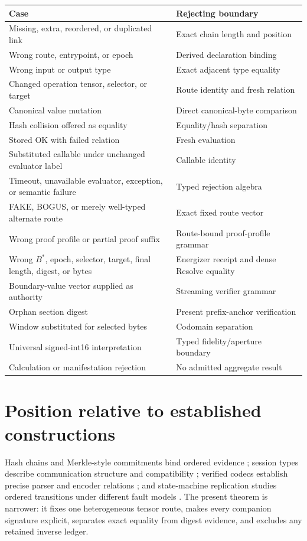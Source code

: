 \documentclass[11pt,letterpaper]{article}
\theoremstyle{definition}
\begin{document}
\begin{table}[ht]
\centering\small
\begin{tabularx}{\textwidth}{@{}YY@{}}
\toprule
Case & Rejecting boundary\\
\midrule
Missing, extra, reordered, or duplicated link & Exact chain length and position\\
Wrong route, entrypoint, or epoch & Derived declaration binding\\
Wrong input or output type & Exact adjacent type equality\\
Changed operation tensor, selector, or target & Route identity and fresh relation\\
Canonical value mutation & Direct canonical-byte comparison\\
Hash collision offered as equality & Equality/hash separation\\
Stored OK with failed relation & Fresh evaluation\\
Substituted callable under unchanged evaluator label & Callable identity\\
Timeout, unavailable evaluator, exception, or semantic failure & Typed rejection algebra\\
FAKE, BOGUS, or merely well-typed alternate route & Exact fixed route vector\\
Wrong proof profile or partial proof suffix & Route-bound proof-profile grammar\\
Wrong $B^*$, epoch, selector, target, final length, digest, or bytes & Energizer receipt and dense Resolve equality\\
Boundary-value vector supplied as authority & Streaming verifier grammar\\
Orphan section digest & Present prefix-anchor verification\\
Window substituted for selected bytes & Codomain separation\\
Universal signed-int16 interpretation & Typed fidelity/aperture boundary\\
Calculation or manifestation rejection & No admitted aggregate result\\
\bottomrule
\end{tabularx}
\end{table}

\section{Position relative to established constructions}

Hash chains and Merkle-style commitments bind ordered evidence
\cite{merkle1988}; session types describe communication structure and
compatibility \cite{honda2008}; verified codecs establish precise parser and
encoder relations \cite{delaware2019}; and state-machine replication studies
ordered transitions under different fault models \cite{lamport1982}.  The
present theorem is narrower: it fixes one heterogeneous tensor route, makes
every companion signature explicit, separates exact equality from digest
evidence, and excludes any retained inverse ledger.
\end{document}
